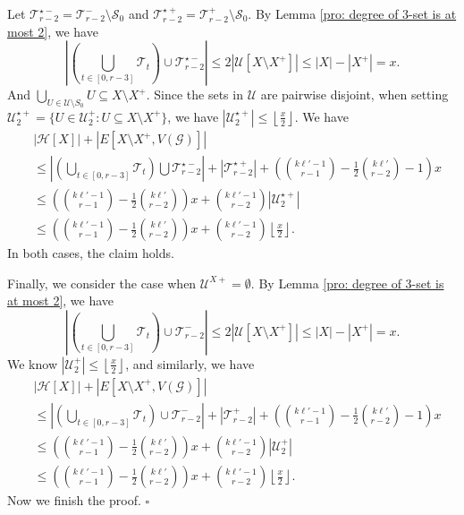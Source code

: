 \documentclass[12pt]{article}%
\newenvironment{proof}{{\noindent\it Proof.}}{\hfill $\square$\par}
\newcommand{\mh}{\mathcal{H}}
\newcommand{\mg}{\mathcal{G}}
\newcounter{cases}
\begin{document}
\begin{proof}
Let $\mathcal{T}_{r-2}^{\star-}=\mathcal{T}_{r-2}^-\setminus\mathcal{S}_0$ and $\mathcal{T}_{r-2}^{\star+}=\mathcal{T}_{r-2}^+\setminus\mathcal{S}_0$. By Lemma \ref{pro: degree of 3-set is at most 2}, we have
\begin{equation*}\label{eq: when t_0=r-2}
    \left|\left(\bigcup_{t\in[0,r-3]}\mathcal{T}_t\right)\cup \mathcal{T}_{r-2}^{\star-}\right|\leq 2|\mathcal{U}[X\setminus X^+]|\leq|X|-|X^+|=x.
\end{equation*}
And $\bigcup_{U\in \mathcal{U}\setminus S_0}U\subseteq X\setminus X^{+}$.
Since the sets in $\mathcal{U}$ are pairwise disjoint, when setting
$\mathcal{U}_2^{\star+}=\{U\in \mathcal{U}_{2}^{+}: U\subseteq X\setminus X^{+}\}$,
we have $|\mathcal{U}_2^{\star +}|\leq \left\lfloor\frac{x}{2}\right\rfloor$. We have
\begin{equation*}
    \begin{aligned}
        &|\mh[X]|+|E[X\setminus X^+,V(\mg)]|\\
        &\leq \left|\left(\bigcup_{t\in[0,r-3]}\mathcal{T}_t\right)\bigcup\mathcal{T}_{r-2}^{\star-}\right|+\left|\mathcal{T}_{r-2}^{\star+}\right|+\left(\binom{k\ell'-1}{r-1}-\frac{1}{2}\binom{k\ell'}{r-2}-1\right)x\\
        &\leq  \left(\binom{k\ell'-1}{r-1}-\frac{1}{2}\binom{k\ell'}{r-2}\right)x+\binom{k\ell'-1}{r-2}|\mathcal{U}_2^{\star+}|\\
        &\leq\left(\binom{k\ell'-1}{r-1}-\frac{1}{2}\binom{k\ell'}{r-2}\right)x+\binom{k\ell'-1}{r-2}\left\lfloor\frac{x}{2}\right\rfloor.
    \end{aligned}
\end{equation*}
In both cases, the claim holds.

Finally, we consider the case when $\mathcal{U}^{X+}=\emptyset$. By Lemma \ref{pro: degree of 3-set is at most 2}, we have
\begin{equation*}\label{eq: when l is odd}
    \left|(\bigcup_{t\in[0,r-3]}\mathcal{T}_t)\cup \mathcal{T}_{r-2}^{-}\right|\leq 2|\mathcal{U}[X\setminus X^+]|\leq|X|-|X^+|=x.
\end{equation*}
We know $|\mathcal{U}_{2}^{+}|\leq \left\lfloor\frac{x}{2}\right\rfloor$, and similarly, we have
\begin{equation*}
    \begin{aligned}
        &|\mh[X]|+|E[X\setminus X^+,V(\mg)]|\\
        &\leq \left|(\bigcup_{t\in[0,r-3]}\mathcal{T}_t)\cup \mathcal{T}_{r-2}^{-}\right|+\left|\mathcal{T}_{r-2}^{+}\right|+\left(\binom{k\ell'-1}{r-1}-\frac{1}{2}\binom{k\ell'}{r-2}-1\right)x\\
        &\leq  \left(\binom{k\ell'-1}{r-1}-\frac{1}{2}\binom{k\ell'}{r-2}\right)x+\binom{k\ell'-1}{r-2}|\mathcal{U}_{2}^{+}|\\
        &\leq\left(\binom{k\ell'-1}{r-1}-\frac{1}{2}\binom{k\ell'}{r-2}\right)x+\binom{k\ell'-1}{r-2}\left\lfloor\frac{x}{2}\right\rfloor.
    \end{aligned}
\end{equation*}
   Now we finish the proof.
\end{proof}
\end{document}
